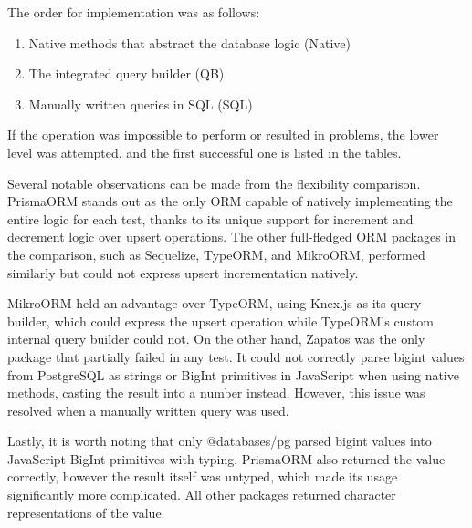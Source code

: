 The order for implementation was as follows:
\begin{enumerate}
  \item Native methods that abstract the database logic (Native)
  \item The integrated query builder (QB)
  \item Manually written queries in SQL (SQL)
\end{enumerate}
If the operation was impossible to perform or resulted in problems, the lower
level was attempted, and the first successful one is listed in the tables.

Several notable observations can be made from the flexibility comparison.
PrismaORM stands out as the only ORM capable of natively implementing the entire
logic for each test, thanks to its unique support for increment and decrement
logic over upsert operations. The other full-fledged ORM packages in the
comparison, such as Sequelize, TypeORM, and MikroORM, performed similarly but
could not express upsert incrementation natively.

MikroORM held an advantage over TypeORM, using Knex.js as its query builder,
which could express the upsert operation while TypeORM's custom internal query
builder could not. On the other hand, Zapatos was the only package that
partially failed in any test. It could not correctly parse bigint values from
PostgreSQL as strings or BigInt primitives in JavaScript when using native
methods, casting the result into a number instead. However, this issue was
resolved when a manually written query was used.

Lastly, it is worth noting that only @databases/pg parsed bigint values into
JavaScript BigInt primitives with typing. PrismaORM also returned the value
correctly, however the result itself was untyped, which made its usage
significantly more complicated. All other packages returned character
representations of the value. 


